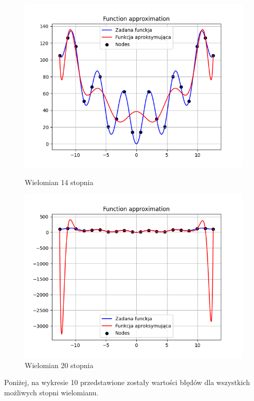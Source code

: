 \documentclass{article}
\begin{document}
\begin{figure}[H]
\begin{minipage}[b]{0.49\textwidth}
    \begin{minipage}[b]{\textwidth}
      \includegraphics[width=\textwidth]{img08.png}
      \caption{Wielomian 14 stopnia}
    \end{minipage}
    \vspace*{\fill}
    \begin{minipage}[b]{\textwidth}
      \includegraphics[width=\textwidth]{img09.png}
      \caption{Wielomian 20 stopnia}
    \end{minipage}
  \end{minipage}
\end{figure}

Poniżej, na wykresie 10 przedstawione zostały wartości błędów dla wszystkich możliwych stopni wielomianu.
\end{document}
